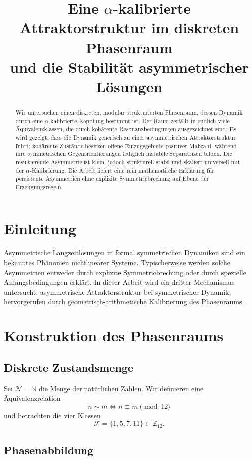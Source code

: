 \documentclass[11pt]{article}
\title{Eine $\alpha$-kalibrierte Attraktorstruktur im diskreten Phasenraum\\
und die Stabilität asymmetrischer Lösungen}
\author{}
\date{}
\begin{document}
\maketitle

\begin{abstract}
Wir untersuchen einen diskreten, modular strukturierten Phasenraum, dessen Dynamik
durch eine $\alpha$-kalibrierte Kopplung bestimmt ist. Der Raum zerfällt in endlich
viele Äquivalenzklassen, die durch kohärente Resonanzbedingungen ausgezeichnet sind.
Es wird gezeigt, dass die Dynamik generisch zu einer asymmetrischen Attraktorstruktur
führt: kohärente Zustände besitzen offene Einzugsgebiete positiver Maßzahl, während
ihre symmetrischen Gegenorientierungen lediglich instabile Separatrizen bilden.
Die resultierende Asymmetrie ist klein, jedoch strukturell stabil und skaliert
universell mit der $\alpha$-Kalibrierung. Die Arbeit liefert eine rein mathematische
Erklärung für persistente Asymmetrien ohne explizite Symmetriebrechung auf Ebene der
Erzeugungsregeln.
\end{abstract}

\section{Einleitung}

Asymmetrische Langzeitlösungen in formal symmetrischen Dynamiken sind ein bekanntes
Phänomen nichtlinearer Systeme. Typischerweise werden solche Asymmetrien entweder durch
explizite Symmetriebrechung oder durch spezielle Anfangsbedingungen erklärt. In dieser
Arbeit wird ein dritter Mechanismus untersucht: asymmetrische Attraktorstruktur bei
symmetrischer Dynamik, hervorgerufen durch geometrisch-arithmetische Kalibrierung des
Phasenraums.

\section{Konstruktion des Phasenraums}

\subsection{Diskrete Zustandsmenge}

Sei $\mathcal{N}=\mathbb{N}$ die Menge der natürlichen Zahlen. Wir definieren eine
Äquivalenzrelation
\[
n \sim m \iff n \equiv m \pmod{12}
\]
und betrachten die vier Klassen
\[
\mathcal{F}=\{1,5,7,11\}\subset\mathbb{Z}_{12}.
\]

\subsection{Phasenabbildung}
\end{document}
